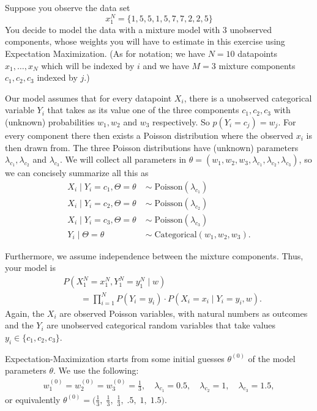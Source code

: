\documentclass[a4paper,10pt,landscape,twocolumn]{scrartcl}
\begin{document}
\begin{exercise}
	Suppose you observe the data set 
	\[
		x_1^N = \{1, 5, 5, 1, 5, 7, 7, 2, 2, 5\}
	\] 
	You decide to model the data with a mixture model with 3 unobserved components, whose weights you will have to estimate in this exercise using Expectation Maximization. (As for notation; we have $N=10$ datapoints $x_1, \dots, x_N$ which will be indexed by $i$ and we have $M=3$ mixture components $c_1, c_2, c_3$ indexed by $j$.) 
	
	Our model assumes that for every datapoint $X_i$, there is a unobserved categorical variable $Y_i$ that takes as its value one of the three components $c_1, c_2, c_3$ with (unknown) probabilities $w_1, w_2$ and $w_3$ respectively. So $p(Y_i = c_j) = w_j$. For every component there then exists a Poisson distribution where the observed $x_i$ is then drawn from. The three Poisson distributions have (unknown) parameters $\lambda_{c_{1}}, \lambda_{c_{2}}$ and $\lambda_{c_{3}}$. We will collect all parameters in $\theta = (w_1, w_2, w_3, \lambda_{c_1}, \lambda_{c_2}, \lambda_{c_3})$, so we can concisely summarize all this as
	\begin{align*}
		X_i \mid Y_i = c_1, \Theta=\theta \; &\sim \; \text{Poisson}(\lambda_{c_1})\\
		X_i \mid Y_i = c_2, \Theta=\theta \; &\sim \; \text{Poisson}(\lambda_{c_2})\\
		X_i \mid Y_i = c_3, \Theta=\theta \; &\sim \; \text{Poisson}(\lambda_{c_3})\\
		Y_i \mid \Theta=\theta \; &\sim \; \text{Categorical}(w_1, w_2, w_3).
	\end{align*}

	Furthermore, we assume independence between the mixture components. Thus, your model is
	\begin{align*}
	&P(X_1^N=x_1^N, Y_1^N=y_1^N\mid w) \\
		&\qquad= \prod_{i=1}^N P(Y_{i}=y_{i}) \cdot P(X_{i}=x_{i}\mid Y_{i}=y_{i}, w).
	\end{align*}
	Again, the $X_i$ are observed Poisson variables, with natural numbers as outcomes and the $Y_i$ are unobserved categorical random variables that take values $y_i \in \{c_1, c_2, c_3\}$.
	
	Expectation-Maximization starts from some initial guesses $\theta^{(0)}$ of the model parameters $\theta$. We use the following:
	\begin{align*}
	w_1^{(0)} = w_2^{(0)} = w_3^{(0)} = \frac{1}{3}, \quad \lambda_{c_1} = 0.5, \quad \lambda_{c_2} = 1, \quad \lambda_{c_3} = 1.5,
	\end{align*}
	or equivalently $\theta^{(0)} = \bigl(\frac{1}{3},\; \frac 1 3,\; \frac 1 3,\; .5,\; 1,\; 1.5\bigr)$.


\end{exercise}
\end{document}
